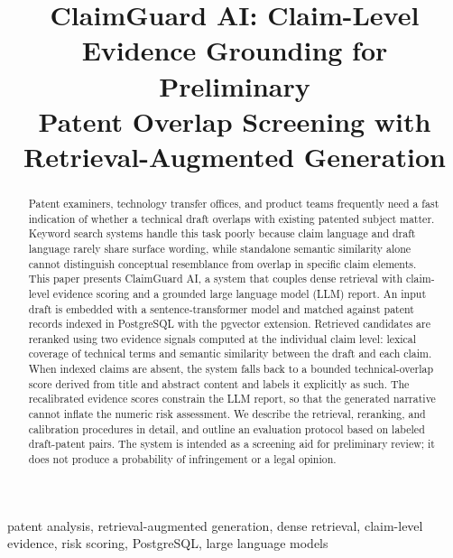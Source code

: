 \documentclass[journal]{IEEEtran}
\begin{document}
\title{ClaimGuard AI: Claim-Level Evidence Grounding for Preliminary\\
Patent Overlap Screening with Retrieval-Augmented Generation}

\author{%
\and
{}
}

\maketitle

\begin{abstract}
Patent examiners, technology transfer offices, and product teams frequently need a fast indication of whether a technical draft overlaps with existing patented subject matter. Keyword search systems handle this task poorly because claim language and draft language rarely share surface wording, while standalone semantic similarity alone cannot distinguish conceptual resemblance from overlap in specific claim elements. This paper presents ClaimGuard AI, a system that couples dense retrieval with claim-level evidence scoring and a grounded large language model (LLM) report. An input draft is embedded with a sentence-transformer model and matched against patent records indexed in PostgreSQL with the pgvector extension. Retrieved candidates are reranked using two evidence signals computed at the individual claim level: lexical coverage of technical terms and semantic similarity between the draft and each claim. When indexed claims are absent, the system falls back to a bounded technical-overlap score derived from title and abstract content and labels it explicitly as such. The recalibrated evidence scores constrain the LLM report, so that the generated narrative cannot inflate the numeric risk assessment. We describe the retrieval, reranking, and calibration procedures in detail, and outline an evaluation protocol based on labeled draft-patent pairs. The system is intended as a screening aid for preliminary review; it does not produce a probability of infringement or a legal opinion.
\end{abstract}

\begin{IEEEkeywords}
patent analysis, retrieval-augmented generation, dense retrieval, claim-level evidence, risk scoring, PostgreSQL, large language models
\end{IEEEkeywords}
\end{document}
